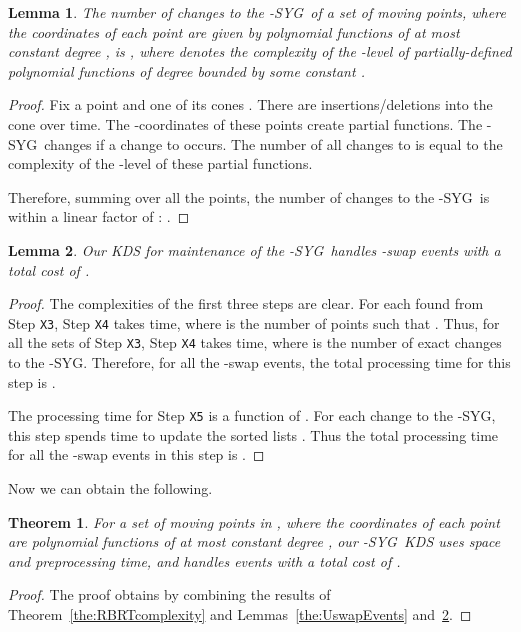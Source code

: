 \documentclass[preprint,12pt]{elsarticle}
\def\ksyg{\mbox{-SYG}}
\newtheorem{theorem}{Theorem}[section]
\newtheorem{lemma}{Lemma}[section]
\begin{document}
\begin{lemma}\label{the:allKSYGchanges}
The number of changes to the \ksyg~of a set of  moving points, where the coordinates of each point are given by polynomial functions of at most constant degree , is , where  denotes the complexity of the -level of  partially-defined polynomial functions of degree bounded by some constant . 
\end{lemma}
\begin{proof}
Fix a point  and one of its cones . There are  insertions/deletions into the cone  over time. The -coordinates of these points create  partial functions. The \ksyg~changes if a change to  occurs. The number of all changes to  is equal to  the complexity of the -level of these  partial functions.

Therefore, summing over all the  points, the number of changes to the \ksyg~is within a linear factor of : . 
\end{proof}


\begin{lemma}\label{the:XswapEvents}
Our KDS for maintenance of the \ksyg~handles  -swap events with a total cost of .
\end{lemma}
\begin{proof}
The complexities of the first three steps are clear. For each found  from Step \texttt{X3}, Step \texttt{X4} takes  time, where  is the number of points  such that . Thus, for all the  sets  of Step \texttt{X3}, Step \texttt{X4} takes  time, where  is the number of exact changes to the \ksyg. Therefore, for all the  -swap events, the total processing time for this step is .

The processing time for Step \texttt{X5} is a function of . For each change to the \ksyg, this step spends  time to update the sorted lists . Thus the total processing time for all the -swap events in this step is .
\end{proof}


Now we can obtain the following.
\begin{theorem}\label{the:KinetickSYG}
For a set of  moving points in , where the coordinates of each point are polynomial functions of at most constant degree , our \ksyg~KDS uses  space and  preprocessing time, and handles  events with a total cost of .
\end{theorem}
\begin{proof}
The proof obtains by combining the results of Theorem~\ref{the:RBRTcomplexity} and Lemmas~\ref{the:UswapEvents} and~\ref{the:XswapEvents}.
\end{proof}
\end{document}
